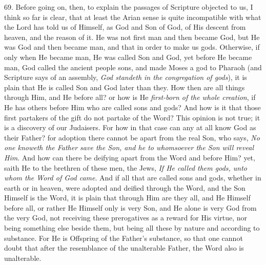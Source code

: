 69. Before going on, then, to
explain the passages of Scripture objected to us, I think so far is
clear, that at least the Arian sense is quite incompatible with what
the Lord has told us of Himself, as God and Son of God, of His descent
from heaven, and the reason of it. He was not first man and then
became God, but He was God and then became man, and that in order to
make us gods. Otherwise, if only when He became man, He was called Son
and God, yet before He became man, God called the ancient people sons,
and made Moses a god to Pharaoh (and Scripture says of an assembly, \emph{God
standeth in the congregation of gods}), it is plain that He is
called Son and God later than they. How then are all things through
Him, and He before all? or how is He \emph{first-born of the whole
creation}, if He has others before Him who are called sons and
gods? And how is it that those first partakers of the gift do not
partake of the Word? This opinion is not true; it is a discovery of
our Judaisers. For how in that case can any at all know God as their
Father? for adoption there cannot be apart from the real Son, who
says, \emph{No one knoweth the Father save the Son, and he to whomsoever
the Son will reveal Him}. And how can there be deifying apart from
the Word and before Him? yet, saith He to the brethren of these men,
the Jews, \emph{If He called them gods, unto whom the Word of God came}.
And if all that are called sons and gods, whether in earth or in
heaven, were adopted and deified through the Word, and the Son Himself
is the Word, it is plain that through Him are they all, and He Himself
before all, or rather He Himself only is very Son, and He alone is
very God from the very God, not receiving these prerogatives as a
reward for His virtue, nor being something else beside them, but being
all these by nature and according to substance. For He is Offspring of
the Father's substance, so that one cannot doubt that after the
resemblance of the unalterable Father, the Word also is unalterable.

